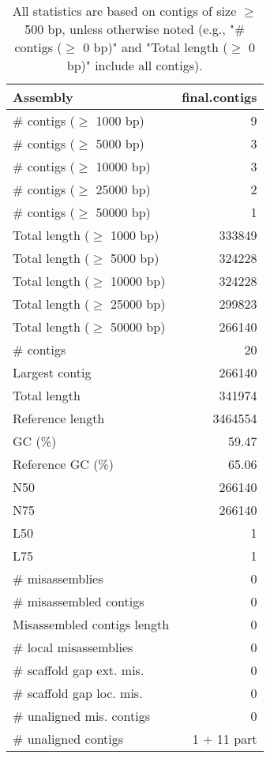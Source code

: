 \documentclass[12pt,a4paper]{article}
\begin{document}
\begin{table}[ht]
\begin{center}
\caption{All statistics are based on contigs of size $\geq$ 500 bp, unless otherwise noted (e.g., "\# contigs ($\geq$ 0 bp)" and "Total length ($\geq$ 0 bp)" include all contigs).}
\begin{tabular}{|l*{1}{|r}|}
\hline
Assembly & final.contigs \\ \hline
\# contigs ($\geq$ 1000 bp) & 9 \\ \hline
\# contigs ($\geq$ 5000 bp) & 3 \\ \hline
\# contigs ($\geq$ 10000 bp) & 3 \\ \hline
\# contigs ($\geq$ 25000 bp) & 2 \\ \hline
\# contigs ($\geq$ 50000 bp) & 1 \\ \hline
Total length ($\geq$ 1000 bp) & 333849 \\ \hline
Total length ($\geq$ 5000 bp) & 324228 \\ \hline
Total length ($\geq$ 10000 bp) & 324228 \\ \hline
Total length ($\geq$ 25000 bp) & 299823 \\ \hline
Total length ($\geq$ 50000 bp) & 266140 \\ \hline
\# contigs & 20 \\ \hline
Largest contig & 266140 \\ \hline
Total length & 341974 \\ \hline
Reference length & 3464554 \\ \hline
GC (\%) & 59.47 \\ \hline
Reference GC (\%) & 65.06 \\ \hline
N50 & 266140 \\ \hline
N75 & 266140 \\ \hline
L50 & 1 \\ \hline
L75 & 1 \\ \hline
\# misassemblies & 0 \\ \hline
\# misassembled contigs & 0 \\ \hline
Misassembled contigs length & 0 \\ \hline
\# local misassemblies & 0 \\ \hline
\# scaffold gap ext. mis. & 0 \\ \hline
\# scaffold gap loc. mis. & 0 \\ \hline
\# unaligned mis. contigs & 0 \\ \hline
\# unaligned contigs & 1 + 11 part \\ \hline

\end{tabular}
\end{center}
\end{table}
\end{document}
